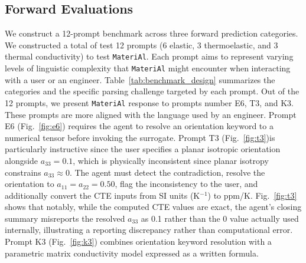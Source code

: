 \documentclass[preprint,review,10pt,number]{elsarticle}
\begin{document}
\subsection{Forward Evaluations}
We construct a 12-prompt benchmark across three forward prediction categories.
We constructed a total of test 12 prompts (6 elastic, 3 thermoelastic, and 3 thermal conductivity) to test \texttt{MateriAl}.
Each prompt aims to represent varying levels of linguistic complexity that \texttt{MateriAl} might encounter when interacting with a user or an engineer.
Table~\ref{tab:benchmark_design} summarizes the categories and the specific parsing challenge targeted by each prompt.
Out of the 12 prompts, we present \texttt{MateriAl} response to prompts number E6, T3, and K3. 
These prompts are more aligned with the language used by an engineer.
Prompt E6 (Fig.~\ref{fig:e6}) requires the agent to resolve an orientation keyword to a numerical tensor before invoking the surrogate. 
Prompt T3 (Fig.~\ref{fig:t3})is particularly instructive since the user specifies a planar isotropic orientation alongside $a_{33} = 0.1$, which is physically inconsistent since planar isotropy constrains $a_{33} \approx 0$. The agent must detect the contradiction, resolve the orientation to $a_{11} = a_{22} = 0.50$, flag the inconsistency to the user, and additionally convert the CTE inputs from SI units (K$^{-1}$) to ppm/K.
Fig.~\ref{fig:t3} shows that
notably, while the computed CTE values are exact, the agent's closing summary misreports the resolved $a_{33}$ as 0.1 rather than the 0 value actually used internally, illustrating a reporting discrepancy rather than computational error.
Prompt K3 (Fig.~\ref{fig:k3}) combines orientation keyword resolution with a parametric matrix conductivity model expressed as a written formula. 
\end{document}
